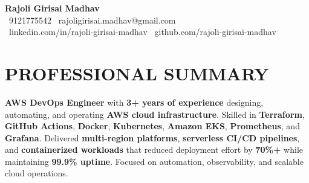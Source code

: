 \documentclass[letterpaper,11pt]{article}
\begin{document}
\begin{center}
    \textbf{\Huge Rajoli Girisai Madhav} \\ \vspace{5pt}
    \small
    \faPhone*~9121775542 \quad
    \faEnvelope~rajoligirisai.madhav@gmail.com \\

    \faLinkedin~linkedin.com/in/rajoli-girisai-madhav \quad
    \faGithub~github.com/rajoli-girisai-madhav
    \\ \vspace{-3pt}
\end{center}

\section{PROFESSIONAL SUMMARY}
\noindent \textbf{AWS DevOps Engineer} with \textbf{3+ years of experience} designing, automating, and operating \textbf{AWS cloud infrastructure}. Skilled in \textbf{Terraform}, \textbf{GitHub Actions}, \textbf{Docker}, \textbf{Kubernetes}, \textbf{Amazon EKS}, \textbf{Prometheus}, and \textbf{Grafana}. Delivered \textbf{multi-region platforms}, \textbf{serverless CI/CD pipelines}, and \textbf{containerized workloads} that reduced deployment effort by \textbf{70\%+} while maintaining \textbf{99.9\% uptime}. Focused on automation, observability, and scalable cloud operations.

\end{document}
